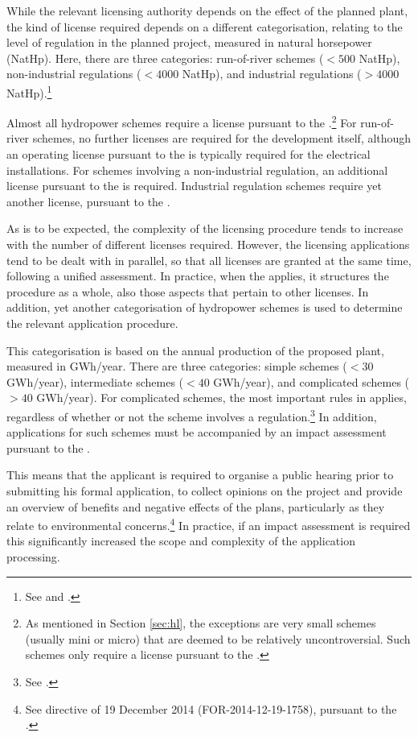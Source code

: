 While the relevant licensing authority depends on the effect of the planned plant, the kind of license required depends on a different categorisation, relating to the level of regulation in the planned project, measured in natural horsepower (NatHp). Here, there are three categories: run-of-river schemes  ($< 500$ NatHp), non-industrial regulations ($< 4000$ NatHp), and industrial regulations ($> 4000$ NatHp).\footnote{See \cite[2]{wra17} and \cite[1,2]{ica17}.} %

Almost all hydropower schemes require a license pursuant to the \cite[8]{wra00}.\footnote{As mentioned in Section \ref{sec:hl}, the exceptions are very small schemes (usually mini or micro) that are deemed to be relatively uncontroversial. Such schemes only require a license pursuant to the \cite{pb08}.} For run-of-river schemes, no further licenses are required for the development itself, although an operating license pursuant to the \cite{ea90} is typically required for the electrical installations. For schemes involving a non-industrial regulation, an additional license pursuant to the \cite[8]{wra17} is required. Industrial regulation schemes require yet another license, pursuant to the \cite[2]{ica17}.

As is to be expected, the complexity of the licensing procedure tends to increase with the number of different licenses required. However, the licensing applications tend to be dealt with in parallel, so that all licenses are granted at the same time, following a unified assessment. In practice, when the \cite{wra17} applies, it structures the procedure as a whole, also those aspects that pertain to other licenses. In addition, yet another categorisation of hydropower schemes is used to determine the relevant application procedure.

This categorisation is based on the annual production of the proposed plant, measured in GWh/year. There are three categories: simple schemes ($< 30$ GWh/year), intermediate schemes ($< 40$ GWh/year), and complicated schemes ($> 40$ GWh/year). For complicated schemes, the most important rules in \cite{wra17} applies, regardless of whether or not the scheme involves a regulation.\footnote{See \cite[19]{wra00}.} In addition, applications for such schemes must be accompanied by an impact assessment pursuant to the \cite[14-6]{pb08}.

This means that the applicant is required to organise a public hearing prior to submitting his formal application, to collect opinions on the project and provide an overview of benefits and negative effects of the plans, particularly as they relate to environmental concerns.\footnote{See directive of 19 December 2014 (FOR-2014-12-19-1758), pursuant to the \cite[1-2,14-6]{pb08}.} In practice, if an impact assessment is required this significantly increased the scope and complexity of the application processing.

